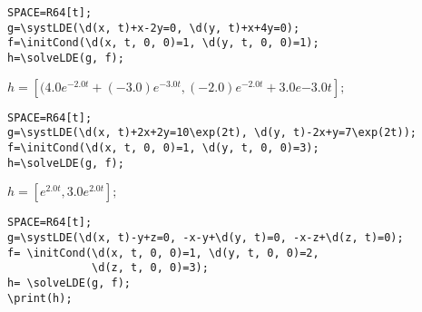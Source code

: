 \begin{verbatim}
SPACE=R64[t];
g=\systLDE(\d(x, t)+x-2y=0, \d(y, t)+x+4y=0);
f=\initCond(\d(x, t, 0, 0)=1, \d(y, t, 0, 0)=1);
h=\solveLDE(g, f);  
\end{verbatim}

{$h = [(4.0 e^{-2.0t}+(-3.0) e^{-3.0t}, (-2.0) e^{-2.0t}+3.0 e{-3.0t}];$}

\begin{verbatim}
SPACE=R64[t];
g=\systLDE(\d(x, t)+2x+2y=10\exp(2t), \d(y, t)-2x+y=7\exp(2t));
f=\initCond(\d(x, t, 0, 0)=1, \d(y, t, 0, 0)=3);
h=\solveLDE(g, f);  
\end{verbatim}

{$h = [e^{2.0t}, 3.0 e^{2.0t}];$}

\begin{verbatim}
SPACE=R64[t];
g=\systLDE(\d(x, t)-y+z=0, -x-y+\d(y, t)=0, -x-z+\d(z, t)=0);
f= \initCond(\d(x, t, 0, 0)=1, \d(y, t, 0, 0)=2, 
             \d(z, t, 0, 0)=3);
h= \solveLDE(g, f);  
\print(h);
\end{verbatim}

